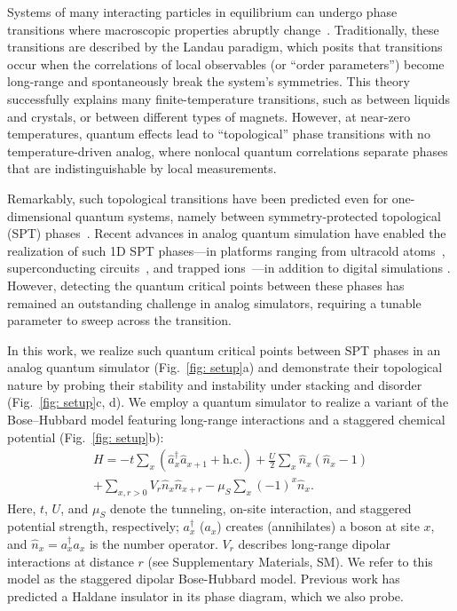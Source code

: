 \documentclass[preprint,superscriptaddress,floatfix, nofootinbib]{revtex4-2}
\begin{document}
Systems of many interacting particles in equilibrium can undergo phase transitions where macroscopic properties abruptly change~\cite{Sachdev1999}. 
%
Traditionally, these transitions are described by the Landau paradigm, which posits that transitions occur when the correlations of local observables (or ``order parameters'') become long-range and spontaneously break the system's symmetries.
%
This theory successfully explains many finite-temperature transitions, such as between liquids and crystals, or between different types of magnets.
%
However, at near-zero temperatures, quantum effects lead to ``topological'' phase transitions with no temperature-driven analog, where nonlocal quantum correlations separate phases that are indistinguishable by local measurements.



Remarkably, such topological transitions have been predicted even for one-dimensional quantum systems, namely between symmetry-protected topological (SPT) phases~\cite{Senthil2015, Pollmann2010, Turner11, Fidkowski11, Pollmann2012, Schuch2011, Chen2011, Chen2012}.
%
Recent advances in analog quantum simulation have enabled the realization of such 1D SPT phases---in platforms ranging from ultracold atoms~\cite{Atala2013, Meier2016, Sylvain2019, Sompet2022}, superconducting circuits~\cite{Cai2019}, and trapped ions~\cite{Katz2024}---in addition to digital simulations \cite{Choo2018, Smith2022, Herrmann2022}.
%
However, detecting the quantum critical points between these phases has remained an outstanding challenge in analog simulators, requiring a tunable parameter to sweep across the transition.

In this work, we realize such quantum critical points between SPT phases in an analog quantum simulator (Fig.~\ref{fig: setup}a) and demonstrate their topological nature by probing their stability and instability under stacking and disorder (Fig.~\ref{fig: setup}c, d). We employ a quantum simulator \cite{Bloch2008, Gross2017, Bohrdt2021} to realize a variant of the Bose–Hubbard model featuring long-range interactions and a staggered chemical potential (Fig.~\ref{fig: setup}b):
\begin{equation}
\label{eq: Hamiltonian}
\begin{split}
H=-t\sum_{x}(\hat{a}_x^\dag \hat{a}_{x + 1}+\mathrm{h.c.})+\frac{U}{2}\sum_x\hat{n}_x(\hat{n}_x-1) \\
+\sum_{x, r>0}V_{r}\hat{n}_x\hat{n}_{x + r} - \mu_S\sum_x(-1)^x\hat{n}_x.
\end{split}
\end{equation} 
Here, $t$, $U$, and $\mu_S$ denote the tunneling, on-site interaction, and staggered potential strength, respectively; $a_x^{\dagger}$ ($a_x$) creates (annihilates) a boson at site $x$, and $\hat{n}_x = a_x^{\dagger} a_x$ is the number operator. $V_r$ describes long-range dipolar interactions at distance $r$ (see Supplementary Materials, SM). We refer to this model as the staggered dipolar Bose-Hubbard model.
%
Previous work \cite{Torre2006,Berg2008} has predicted a Haldane insulator \cite{Haldane1983} in its phase diagram, which we also probe.
\end{document}
